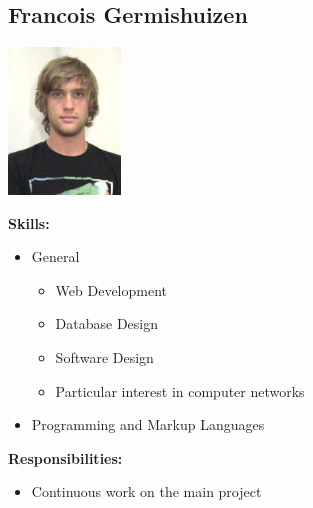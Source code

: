 \documentclass[a4paper,12pt,final]{article}
\begin{document}
\subsection{Francois Germishuizen}
\begin{center}
\includegraphics[width=3cm]{Francois.jpg}
\end{center}
\textbf{Skills:}
\begin{itemize}
\item General
\begin{itemize}
\item Web Development
\item Database Design
\item Software Design
\item Particular interest in computer networks
\end{itemize}
\item Programming and Markup Languages
\begin{itemize}
\end{itemize}
\end{itemize}
\textbf{Responsibilities:}
\begin{itemize}
\item Continuous work on the main project
\end{itemize}
\end{document}
